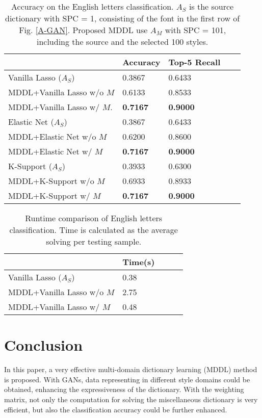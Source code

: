 \documentclass{article}
\begin{document}
\begin{table}[!tb]
\caption{Accuracy on the English letters classification. $A_S$ is the source dictionary with SPC = 1, consisting of the font in the first row of Fig. \ref{A-GAN}. Proposed MDDL use $A_M$ with SPC = 101, including the source and the selected 100 styles.}
\label{Table3}
\begin{center}
\begin{tabular}{|l|l|l|l|l|}
\hline
                              & Accuracy & Top-5 Recall        \\ \hline
Vanilla Lasso ($A_S$)         & 0.3867   & 0.6433              \\ \hline
MDDL+Vanilla Lasso w/o $M$    & 0.6133   & 0.8533              \\ \hline
MDDL+Vanilla Lasso w/ $M$.     & \bf{0.7167}   & \bf{0.9000}    \\ \hline
Elastic Net ($A_S$)           & 0.3867   & 0.6433              \\ \hline
MDDL+Elastic Net w/o $M$      & 0.6200   & 0.8600              \\ \hline
MDDL+Elastic Net w/ $M$        & \bf{0.7167}   & \bf{0.9000}    \\ \hline
K-Support ($A_S$)         & 0.3933   & 0.6300             \\ \hline
MDDL+K-Support w/o $M$        & 0.6933   & 0.8933             \\ \hline
MDDL+K-Support w/ $M$          & \bf{0.7167}   & \bf{0.9000}         \\ \hline 
\end{tabular}
\end{center}
\end{table}

\begin{table}[tb]
\caption{Runtime comparison of English letters classification. Time is calculated as the average solving per testing sample.}
\label{Table4}
\begin{center}
\begin{tabular}{|l|l|l|l|l|}
\hline
                            & Time(s) \\ \hline
Vanilla Lasso ($A_S$)       & 0.38     \\ \hline
MDDL+Vanilla Lasso w/o $M$  & 2.75    \\ \hline
MDDL+Vanilla Lasso w/ $M$   & 0.48            \\ \hline
\end{tabular}
\end{center}
\end{table}

\section{Conclusion}

In this paper, a very effective multi-domain dictionary learning (MDDL) method is proposed. With GANs, data representing in different style domains could be obtained, enhancing the expressiveness of the dictionary. With the weighting matrix, not only the computation for solving the miscellaneous dictionary is very efficient, but also the classification accuracy could be further enhanced. 



\end{document}
